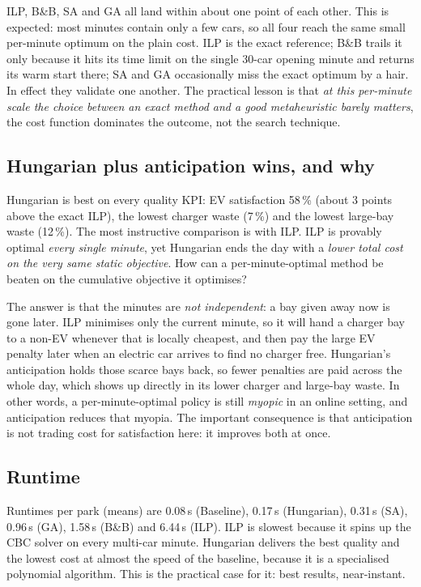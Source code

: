 \documentclass[11pt,a4paper]{article}
\begin{document}
ILP, B\&B, SA and GA all land within about one point of each other. This is expected:
most minutes contain only a few cars, so all four reach the same small per-minute optimum
on the plain cost. ILP is the exact reference; B\&B trails it only because it hits its
time limit on the single 30-car opening minute and returns its warm start there; SA and
GA occasionally miss the exact optimum by a hair. In effect they validate one another.
The practical lesson is that \emph{at this per-minute scale the choice between an exact
method and a good metaheuristic barely matters}, the cost function dominates the
outcome, not the search technique.

\subsection{Hungarian plus anticipation wins, and why}

Hungarian is best on every quality KPI: EV satisfaction 58\,\% (about 3 points above the
exact ILP), the lowest charger waste (7\,\%) and the lowest large-bay waste (12\,\%). The
most instructive comparison is with ILP. ILP is provably optimal \emph{every single
minute}, yet Hungarian ends the day with a \emph{lower total cost on the very same static
objective}. How can a per-minute-optimal method be beaten on the cumulative objective it
optimises?

The answer is that the minutes are \emph{not independent}: a bay given away now is gone
later. ILP minimises only the current minute, so it will hand a charger bay to a non-EV
whenever that is locally cheapest, and then pay the large EV penalty later when an
electric car arrives to find no charger free. Hungarian's anticipation holds those scarce
bays back, so fewer penalties are paid across the whole day, which shows up directly in
its lower charger and large-bay waste. In other words, a per-minute-optimal policy is
still \emph{myopic} in an online setting, and anticipation reduces that myopia. The
important consequence is that anticipation is not trading cost for satisfaction here: it
improves both at once.

\subsection{Runtime}

Runtimes per park (means) are 0.08\,s (Baseline), 0.17\,s (Hungarian), 0.31\,s (SA),
0.96\,s (GA), 1.58\,s (B\&B) and 6.44\,s (ILP). ILP is slowest because it spins up the CBC
solver on every multi-car minute. Hungarian delivers the best quality and the lowest cost
at almost the speed of the baseline, because it is a specialised polynomial algorithm.
This is the practical case for it: best results, near-instant.
\end{document}
